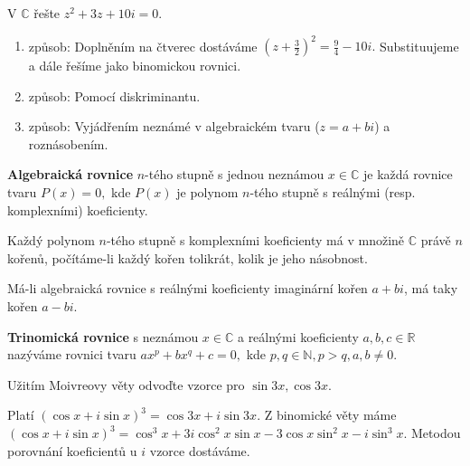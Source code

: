 \begin{priklad}
V $\mathbb C$ řešte $z^2+3z+10i=0.$
\end{priklad}

\begin{reseni}
\begin{enumerate}[1.]
\item způsob: Doplněním na čtverec dostáváme $\left ( z+\frac{3}{2} \right )^2=\frac{9}{4}-10i. $
Substituujeme a dále řešíme jako binomickou rovnici.
\item způsob: Pomocí diskriminantu.
\item způsob: Vyjádřením neznámé v algebraickém tvaru ($z=a+bi$) a roznásobením.
\end{enumerate}
\end{reseni}

\begin{definition}
\textbf{Algebraická rovnice} $n$-tého stupně s jednou neznámou $x\in \mathbb C$ je každá
rovnice tvaru $P(x)=0,$ kde $P(x)$ je polynom $n$-tého stupně s reálnými (resp.
komplexními) koeficienty.
\end{definition}

\begin{veta}
    Každý polynom $n$-tého stupně s komplexními koeficienty má v množině $\mathbb C$
    právě $n$ kořenů, počítáme-li každý kořen tolikrát, kolik je jeho násobnost.
\end{veta}

\begin{veta}
    Má-li algebraická rovnice s reálnými koeficienty imaginární kořen
    $a+bi$, má taky kořen $a-bi.$
\end{veta}

\begin{definition}
\textbf{Trinomická rovnice} s neznámou $x\in \mathbb C$ a reálnými koeficienty $a,b,c \in \mathbb R$
nazýváme rovnici tvaru $ax^p + bx^q + c = 0,$ kde $p,q\in \mathbb N, p>q, a,b\ne 0.$
\end{definition}

\begin{priklad}
Užitím Moivreovy věty odvoďte vzorce pro $\sin 3x, \cos 3x.$
\end{priklad}

\begin{reseni}
Platí $(\cos x + i\sin x)^3=\cos 3x+i\sin 3x.$ Z binomické věty máme
$(\cos x+i\sin x)^3=\cos^3 x + 3i\cos^2 x\sin x - 3\cos x\sin^2 x-i\sin^3 x.$
Metodou porovnání koeficientů u $i$ vzorce dostáváme.
\end{reseni}
